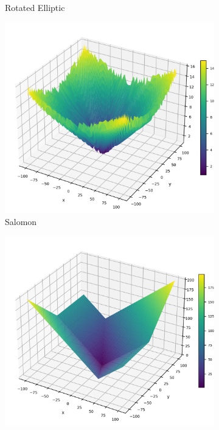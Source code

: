 \begin{figure}[p]
\begin{subfigure}{0.32\textwidth}
        \caption{Rotated Elliptic}
    \end{subfigure}
    \begin{subfigure}{0.32\textwidth}
        \centering
        \includegraphics[width=1\textwidth]{Figures/benchmark_plots/Salomon_maximized.png}
        \caption{Salomon}
    \end{subfigure}
    \begin{subfigure}{0.32\textwidth}
        \centering
        \includegraphics[width=1\textwidth]{Figures/benchmark_plots/Schwefel_N20_maximized.png}

\end{subfigure}
\end{figure}
